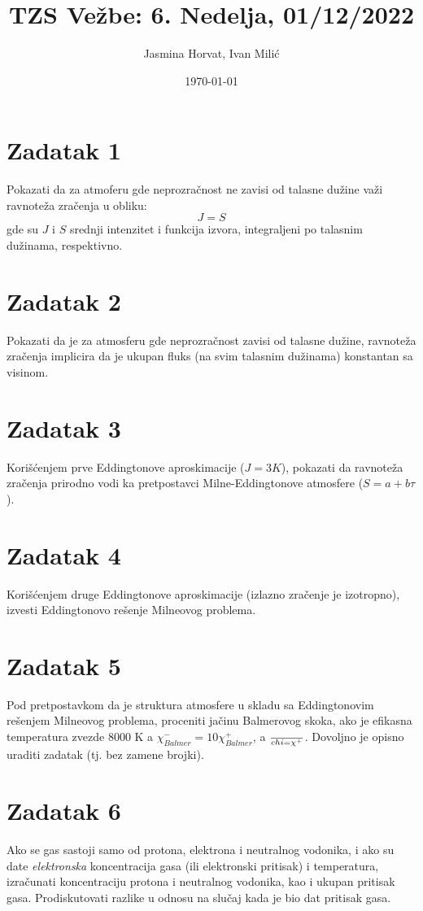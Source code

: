 \documentclass[12pt]{article}
\title{TZS Ve\v{z}be: 6. Nedelja, 01/12/2022}
\author{Jasmina Horvat, Ivan Mili\'{c}}
\date{\today}
\begin{document}
\maketitle

\section{Zadatak 1}
Pokazati da za atmoferu gde neprozra\v{c}nost ne zavisi od talasne du\v{z}ine va\v{z}i ravnote\v{z}a zra\v{c}enja u obliku:
\begin{equation}
J = S 
\end{equation}
gde su $J$ i $S$ srednji intenzitet i funkcija izvora, integraljeni po talasnim du\v{z}inama, respektivno. 

\section{Zadatak 2}
Pokazati da je za atmosferu gde neprozra\v{c}nost zavisi od talasne du\v{z}ine, ravnote\v{z}a zra\v{c}enja implicira da je ukupan fluks (na svim talasnim du\v{z}inama) konstantan sa visinom. 

\section{Zadatak 3}
Kori\v{s}\'{c}enjem prve Eddingtonove aproskimacije ($J = 3K$), pokazati da ravnote\v{z}a zra\v{c}enja prirodno vodi ka pretpostavci Milne-Eddingtonove atmosfere ($S = a+b \tau$).

\section{Zadatak 4}
Kori\v{s}\'{c}enjem druge Eddingtonove aproskimacije (izlazno zra\v{c}enje je izotropno), izvesti Eddingtonovo re\v{s}enje Milneovog problema. 

\section{Zadatak 5}
Pod pretpostavkom da je struktura atmosfere u skladu sa Eddingtonovim re\v{s}enjem Milneovog problema, proceniti ja\v{c}inu Balmerovog skoka, ako je efikasna temperatura zvezde 8000 K a $\chi^-_{Balmer} = 10 \chi^+_{Balmer}$, a $\over{chi} = \chi^+$. Dovoljno je opisno uraditi zadatak (tj. bez zamene brojki).

\section{Zadatak 6}
Ako se gas sastoji samo od protona, elektrona i neutralnog vodonika, i ako su date \emph{elektronska} koncentracija gasa (ili elektronski pritisak) i temperatura, izra\v{c}unati koncentraciju protona i neutralnog vodonika, kao i ukupan pritisak gasa. Prodiskutovati razlike u odnosu na slu\v{c}aj kada je bio dat pritisak gasa. 
\end{document}
